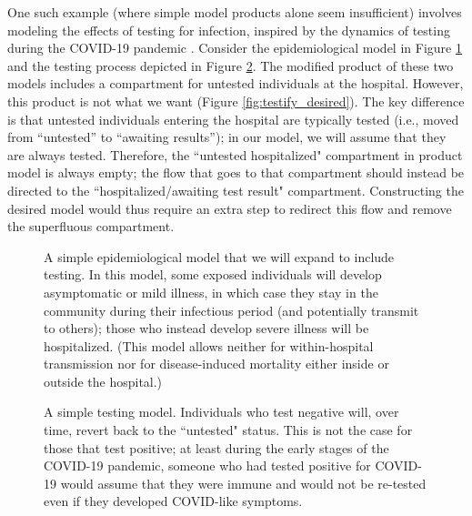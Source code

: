 One such example (where simple model products alone seem insufficient) involves modeling the effects of testing for infection, inspired by the dynamics of testing during the COVID-19 pandemic \citep{gharouni2022testing}. Consider the epidemiological model in Figure \ref{fig:testify_epi} and the testing process depicted in Figure \ref{fig:testify_states}. The modified product of these two models includes a compartment for untested individuals at the hospital. However, this product is not what we want (Figure \ref{fig:testify_desired}). 
The key difference is that untested individuals entering the hospital are typically tested (i.e., moved from ``untested'' to ``awaiting results''); in our model, we will assume that they are always tested.
Therefore, the ``untested hospitalized" compartment in product model is always empty; the flow that goes to that compartment should instead be directed to the ``hospitalized/awaiting test result" compartment. Constructing the desired model would thus require an extra step to redirect this flow and remove the superfluous compartment.


\begin{figure}
    \centering
    
    \caption{A simple epidemiological model that we will expand to include testing. In this model, some exposed individuals will develop asymptomatic or mild illness, in which case they stay in the community during their infectious period (and potentially transmit to others); those who instead develop severe illness will be hospitalized. (This model allows neither for within-hospital transmission nor for disease-induced mortality either inside or outside the hospital.)}
    \label{fig:testify_epi}
\end{figure}

\begin{figure}
    \centering
    
    \caption{A simple testing model. Individuals who test negative will, over time, revert back to the ``untested" status. This is not the case for those that test positive; at least during the early stages of the COVID-19 pandemic, someone who had tested positive for COVID-19 would assume that they were immune and would not be re-tested even if they developed COVID-like symptoms.}
    \label{fig:testify_states}
\end{figure}

